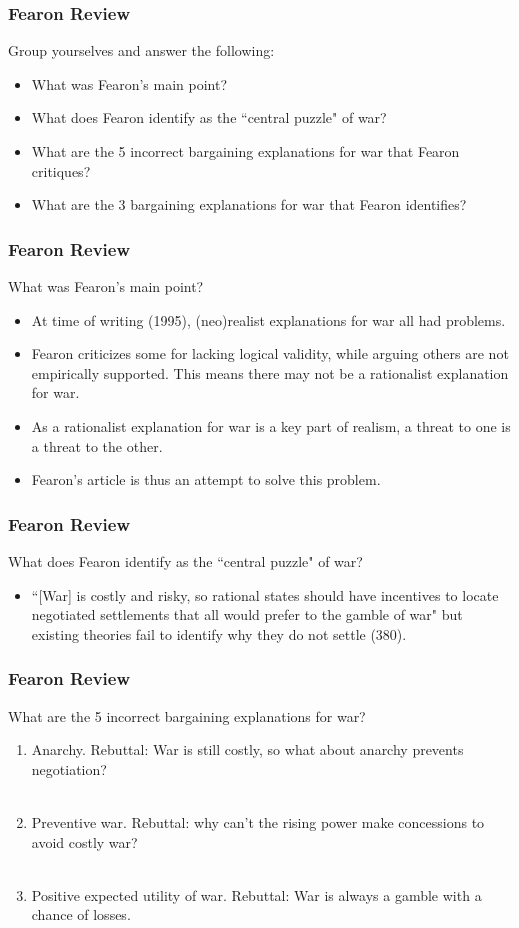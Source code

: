 \documentclass{beamer}
\begin{document}
\begin{frame} 
	\frametitle{\LARGE{Fearon Review}}
	Group yourselves and answer the following:
	\begin{itemize}
		\item What was Fearon's main point?
		\item What does Fearon identify as the ``central puzzle" of war?
		\item What are the 5 incorrect bargaining explanations for war that Fearon critiques?
		\item What are the 3 bargaining explanations for war that Fearon identifies?
	\end{itemize}
\end{frame}

\begin{frame} 
	\frametitle{\LARGE{Fearon Review}}
	What was Fearon's main point? \pause
	\begin{itemize}
		\item At time of writing (1995), (neo)realist explanations for war all had problems. \pause
		\item Fearon criticizes some for lacking logical validity, while arguing others are not empirically supported. This means there may not be a rationalist explanation for war. \pause
		\item As a rationalist explanation for war is a key part of realism, a threat to one is a threat to the other. \pause
		\item Fearon's article is thus an attempt to solve this problem.
	\end{itemize}
\end{frame}

\begin{frame} 
	\frametitle{\LARGE{Fearon Review}}
	What does Fearon identify as the ``central puzzle" of war? \pause
	\begin{itemize}
		\item ``[War] is costly and risky, so rational states should have incentives to locate negotiated settlements that all would prefer to the gamble of war" but existing theories fail to identify why they do not settle (380).
	\end{itemize}
\end{frame}

\begin{frame} 
	\frametitle{\LARGE{Fearon Review}}
	 What are the 5 incorrect bargaining explanations for war? \pause
	\begin{enumerate}
		\item Anarchy. \pause Rebuttal: War is still costly, so what about anarchy prevents negotiation?
		\\~\\
		\item Preventive war. \pause Rebuttal: why can't the rising power make concessions to avoid costly war?
		\\~\\
		\item Positive expected utility of war. \pause Rebuttal: War is always a gamble with a chance of losses.
	\end{enumerate}
\end{frame}
\end{document}
